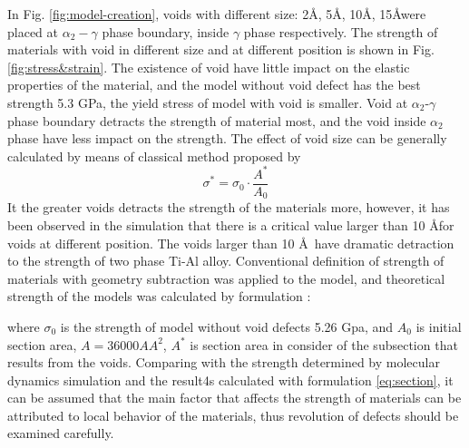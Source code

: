 \documentclass[metals,article,submit,moreauthors,pdftex,10pt,a4paper]{Definitions/mdpi}
\begin{document}
In Fig. \ref{fig:model-creation}, voids with different size: 2\AA, 5\AA, 10\AA, 15\AA were placed  at $\alpha_2-\gamma$ phase boundary, inside $\gamma$ phase respectively. The strength of materials with void in different size and at different position is shown in Fig.\ref{fig:stress&strain}. The existence of void have little impact on the elastic properties of the material, and the model without void defect has the best strength 5.3 GPa, the yield stress of model with void is smaller. Void at $\alpha_2$-$\gamma$ phase boundary  detracts the strength of  material most, and the void inside $\alpha_2$ phase  have less impact on the strength.          
The effect of void size can be generally calculated by means of classical method proposed by 
\begin{equation} \label{eq:section} 
\sigma^* = \sigma_0 \cdot \frac{A^*}{A_0}
\end{equation}
It  the greater voids detracts the strength of the materials more, however, it has been observed in the simulation that there is a critical value larger than 10 \AA for voids at different position. The voids larger than 10 \AA\ have dramatic detraction to the strength of two phase Ti-Al alloy. Conventional definition of strength of materials with geometry subtraction was applied to the model, and theoretical strength of the models was calculated by formulation :
	

	
where $\sigma_0$ is the strength of model without void defects 5.26 Gpa, and $A_0$ is initial section area, $ A = 36000 {AA}^2$, $A^* $ is section area in consider of the subsection that results from the voids. Comparing with the strength determined by molecular dynamics simulation and the result4s calculated with formulation \ref{eq:section}, it can be assumed that the main factor that affects the strength of materials can be attributed to local behavior of the materials, thus revolution of defects should be examined carefully.
\end{document}
